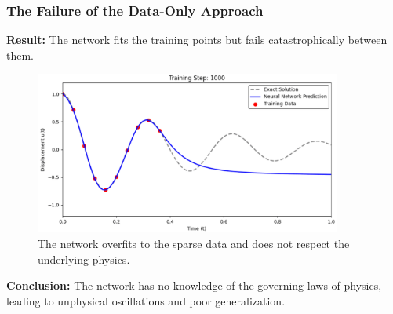 \documentclass[notes]{beamer}
\begin{document}
\begin{frame}
\frametitle{The Failure of the Data-Only Approach}

\textbf{Result:} The network fits the training points but fails catastrophically between them.

\begin{figure}[ht]
	\centering
	\includegraphics[width=0.9\textwidth]{figs/oscillator-result-nn.png}
	\caption*{The network overfits to the sparse data and does not respect the underlying physics.}
\end{figure}

\textbf{Conclusion:} The network has no knowledge of the governing laws of physics, leading to unphysical oscillations and poor generalization.

\end{frame}
\end{document}

